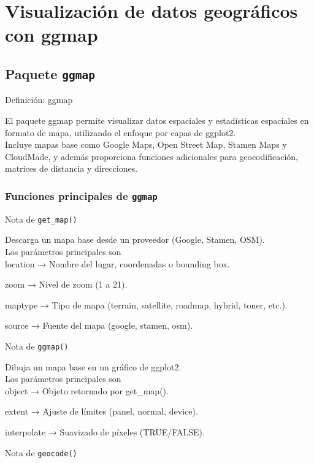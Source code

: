 \documentclass[
]{book}
\begin{document}
\chapter{Visualización de datos geográficos con ggmap}\label{ggmap}

\section{\texorpdfstring{Paquete \texttt{ggmap}}{Paquete ggmap}}\label{paquete-ggmap}

{} Definición: ggmap

El paquete ggmap permite visualizar datos espaciales y estadísticas espaciales en formato de mapa,
utilizando el enfoque por capas de ggplot2.\\
Incluye mapas base como Google Maps, Open Street Map, Stamen Maps y CloudMade,
y además proporciona funciones adicionales para geocodificación, matrices de distancia y direcciones.

\subsection{\texorpdfstring{Funciones principales de \texttt{ggmap}}{Funciones principales de ggmap}}\label{funciones-principales-de-ggmap}

{} Nota de \texttt{get\_map()}

Descarga un mapa base desde un proveedor (Google, Stamen, OSM).\\
Los parámetros principales son\\

location → Nombre del lugar, coordenadas o bounding box.

zoom → Nivel de zoom (1 a 21).

maptype → Tipo de mapa (terrain, satellite, roadmap, hybrid, toner, etc.).

source → Fuente del mapa (google, stamen, osm).

{} Nota de \texttt{ggmap()}

Dibuja un mapa base en un gráfico de ggplot2.\\
Los parámetros principales son\\

object → Objeto retornado por get\_map().

extent → Ajuste de límites (panel, normal, device).

interpolate → Suavizado de píxeles (TRUE/FALSE).

{} Nota de \texttt{geocode()}
\end{document}
